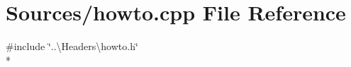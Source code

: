 \section{Sources/howto.cpp File Reference}
\label{howto_8cpp}
{\ttfamily \#include \char`\"{}..\textbackslash{}\+Headers\textbackslash{}howto.\+h\char`\"{}}\\*
